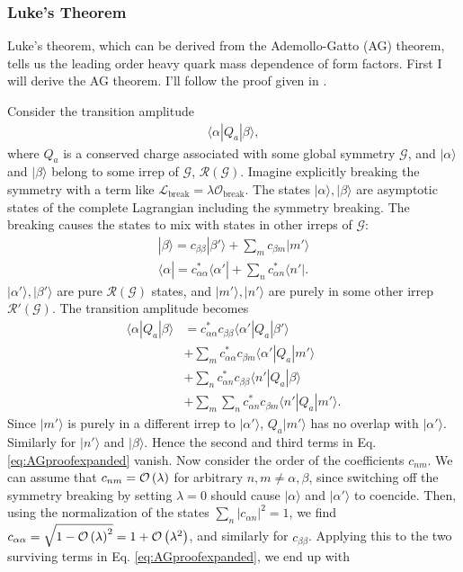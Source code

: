 \subsubsection{Luke's Theorem}
\label{sec:Luke}

Luke's theorem, which can be derived from the Ademollo-Gatto (AG) theorem, tells us the leading order heavy quark mass dependence of form factors. First I will derive the AG theorem. I'll follow the proof given in \cite{Lebed:1991sq}.

Consider the transition amplitude
\begin{align}
  \langle \alpha | Q_a | \beta \rangle,
\end{align}
where $Q_a$ is a conserved charge associated with some global symmetry $\mathcal{G}$, and $|\alpha\rangle$ and $|\beta\rangle$ belong to some irrep of $\mathcal{G}$, $\mathcal{R}(\mathcal{G})$. Imagine explicitly breaking the symmetry with a term like $\mathscr{L}_{\text{break}} = \lambda \mathcal{O}_{\text{break}}$. The states $|\alpha\rangle,|\beta\rangle$ are asymptotic states of the complete Lagrangian including the symmetry breaking. The breaking causes the states to mix with states in other irreps of $\mathcal{G}$:
\begin{align}
  |\beta \rangle = c_{\beta\beta} | \beta' \rangle + \sum_{m} c_{\beta m} | m' \rangle \\
  \langle \alpha | = c^*_{\alpha\alpha} \langle \alpha' | + \sum_{n} c^*_{\alpha n} \langle n' |.
\end{align}
$|\alpha'\rangle,|\beta'\rangle$ are pure $\mathcal{R}(\mathcal{G})$ states, and $|m'\rangle,|n'\rangle$ are purely in some other irrep $\mathcal{R}'(\mathcal{G})$. The transition amplitude becomes
\begin{align}
  \nonumber
  \langle \alpha | Q_a | \beta \rangle
  &= c_{\alpha\alpha}^* c_{\beta\beta} \langle \alpha' | Q_a | \beta' \rangle \\
  \nonumber
  &+ \sum_m c_{\alpha\alpha}^* c_{\beta m} \langle \alpha' | Q_a | m' \rangle \\
  \nonumber
  &+ \sum_n c_{\alpha n}^* c_{\beta \beta} \langle n' | Q_a | \beta \rangle \\
  &+ \sum_m\sum_n c_{\alpha n}^* c_{\beta m} \langle n' | Q_a | m' \rangle.
  \label{eq:AGproofexpanded}
\end{align}
Since $|m'\rangle$ is purely in a different irrep to $|\alpha'\rangle$, $Q_a|m'\rangle$ has no overlap with $|\alpha'\rangle$. Similarly for $|n'\rangle$ and $|\beta\rangle$. Hence the second and third terms in Eq. \ref{eq:AGproofexpanded} vanish. Now consider the order of the coefficients $c_{nm}$. We can assume that $c_{nm} = \mathcal{O}\left( \lambda \right)$ for arbitrary $n,m \neq \alpha,\beta$, since switching off the symmetry breaking by setting $\lambda=0$ should cause $|\alpha\rangle $ and $|\alpha'\rangle$ to coencide. Then, using the normalization of the states $\sum_{n} |c_{\alpha n} |^2 = 1$, we find $c_{\alpha\alpha} = \sqrt{1 - \mathcal{O}\left( \lambda \right)^2} = 1 + \mathcal{O}\left( \lambda^2 \right)$, and similarly for $c_{\beta\beta}$. Applying this to the two surviving terms in Eq. \eqref{eq:AGproofexpanded}, we end up with
